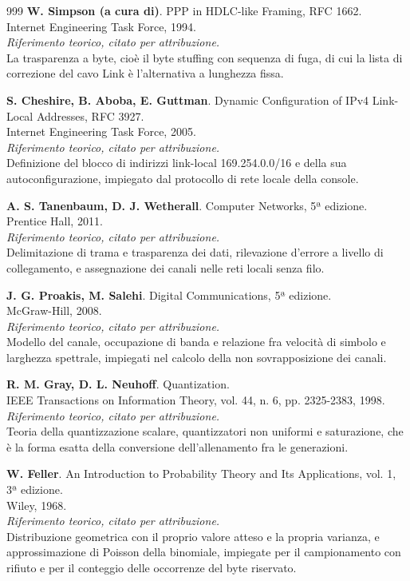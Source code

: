 \begin{thebibliography}{999}
  \textbf{W. Simpson (a cura di)}. PPP in HDLC-like Framing, RFC 1662.
  \\ Internet Engineering Task Force, 1994.
  \\ \emph{Riferimento teorico, citato per attribuzione.}
  \\ La trasparenza a byte, cioè il byte stuffing con sequenza di fuga, di cui la lista di correzione del cavo Link è l'alternativa a lunghezza fissa.

  \textbf{S. Cheshire, B. Aboba, E. Guttman}. Dynamic Configuration of IPv4 Link-Local Addresses, RFC 3927.
  \\ Internet Engineering Task Force, 2005.
  \\ \emph{Riferimento teorico, citato per attribuzione.}
  \\ Definizione del blocco di indirizzi link-local 169.254.0.0/16 e della sua autoconfigurazione, impiegato dal protocollo di rete locale della console.

  \textbf{A. S. Tanenbaum, D. J. Wetherall}. Computer Networks, 5ª edizione.
  \\ Prentice Hall, 2011.
  \\ \emph{Riferimento teorico, citato per attribuzione.}
  \\ Delimitazione di trama e trasparenza dei dati, rilevazione d'errore a livello di collegamento, e assegnazione dei canali nelle reti locali senza filo.

  \textbf{J. G. Proakis, M. Salehi}. Digital Communications, 5ª edizione.
  \\ McGraw-Hill, 2008.
  \\ \emph{Riferimento teorico, citato per attribuzione.}
  \\ Modello del canale, occupazione di banda e relazione fra velocità di simbolo e larghezza spettrale, impiegati nel calcolo della non sovrapposizione dei canali.

  \textbf{R. M. Gray, D. L. Neuhoff}. Quantization.
  \\ IEEE Transactions on Information Theory, vol. 44, n. 6, pp. 2325-2383, 1998.
  \\ \emph{Riferimento teorico, citato per attribuzione.}
  \\ Teoria della quantizzazione scalare, quantizzatori non uniformi e saturazione, che è la forma esatta della conversione dell'allenamento fra le generazioni.

  \textbf{W. Feller}. An Introduction to Probability Theory and Its Applications, vol. 1, 3ª edizione.
  \\ Wiley, 1968.
  \\ \emph{Riferimento teorico, citato per attribuzione.}
  \\ Distribuzione geometrica con il proprio valore atteso e la propria varianza, e approssimazione di Poisson della binomiale, impiegate per il campionamento con rifiuto e per il conteggio delle occorrenze del byte riservato.


\end{thebibliography}
